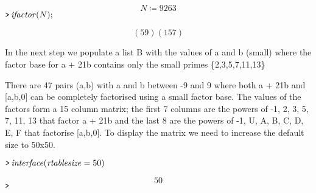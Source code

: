 \documentclass{article}
\begin{document}
\begin{dmath}\label{(21)}
N \coloneqq 9263
\end{dmath}
\mapleinput
{$ \displaystyle \texttt{>\,} \mathit{ifactor} (N); $}

\begin{dmath}\label{(22)}
\left(59\right) \left(157\right)
\end{dmath}
\begin{Maple Normal}

\end{Maple Normal}
\begin{Maple Normal}
In the next step we populate a list B with the values of a and b (small) where the factor base for a + 21b contains only the small primes \{2,3,5,7,11,13\}
\end{Maple Normal}
\begin{Maple Normal}
There are 47 pairs (a,b) with a and b between -9 and 9 where both a + 21b and [a,b,0] can be completely factorised using a small factor base. The values of the factors form a 15 column matrix; the first 7 columns are the powers of -1, 2, 3, 5, 7, 11, 13 that factor a + 21b and the last 8 are the powers of -1, U, A, B, C, D, E, F that factorise [a,b,0]. To display the matrix we need to increase the default size to 50x50.
\end{Maple Normal}
\mapleinput
{$ \displaystyle \texttt{>\,} \mathit{interface} (\mathit{rtablesize} =50) $}

\begin{dmath}\label{(23)}
50
\end{dmath}
\mapleinput
{$ \displaystyle \texttt{>\,}  $}
\end{document}

